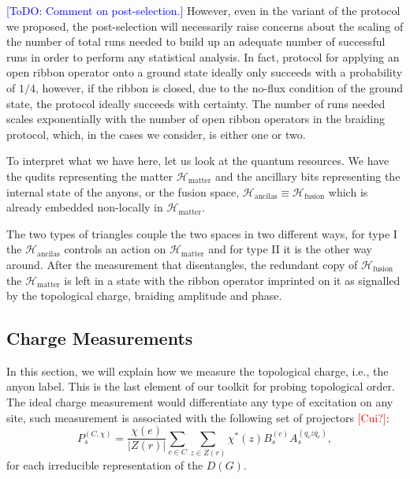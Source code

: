 \documentclass[two column]{article}
\newcommand{\caro}[1]{\textcolor{red}{[#1]}}
\newcommand{\jovan}[1]{\textcolor{blue}{[#1]}}
\begin{document}
\jovan{ToDO: Comment on post-selection.}
However, even in the variant of the protocol we proposed, the post-selection will necessarily raise concerns about the scaling of the number of total runs needed to build up an adequate number of successful runs in order to perform any statistical analysis. In fact, protocol for applying an open ribbon operator onto a ground state ideally only succeeds with a probability of $1/4$, however, if the ribbon is closed, due to the no-flux condition of the ground state, the protocol ideally succeeds with certainty. The number of runs needed scales exponentially with the number of open ribbon operators in the braiding protocol, which, in the cases we consider, is either one or two. 

To interpret what we have here, let us look at the quantum resources. We have the qudits representing the matter $\mathcal{H}_{\text{matter}}$ and the ancillary bits representing the internal state of the anyons, or the fusion space, $\mathcal{H}_{\text{ancilas}} \equiv \mathcal{H}_{\text{fusion}}$ which is already embedded non-locally in  $\mathcal{H}_{\text{matter}}$.

The two types of triangles couple the two spaces in two different ways, for type I the $\mathcal{H}_{\text{ancilas}}$ controls an action on $\mathcal{H}_{\text{matter}}$ and for type II it is the other way around. After the measurement that disentangles, the redundant copy of $\mathcal{H}_{\text{fusion}}$ the $\mathcal{H}_{\text{matter}}$ is left in a state with the ribbon operator imprinted on it as signalled by the topological charge, braiding amplitude and phase.


\subsection{Charge Measurements}\label{sec:redchmmt}

In this section, we will explain how we measure the topological charge, i.e., the anyon label. This is the last element of our toolkit for probing topological order. The ideal charge measurement would differentiate any type of excitation on any site, such measurement is associated with the following set of projectors \caro{Cui?}\cite{}:
\begin{equation}
    P_s^{(C, \chi)} = \frac{\chi(e)}{|Z(r)|}\sum_{c \in C}\sum_{z \in Z(r)}\chi^*(z)B_s^{(c)}A_s^{(q_c z \bar{q}_c)},
\end{equation}
for each irreducible representation of the $D(G)$.
\end{document}
